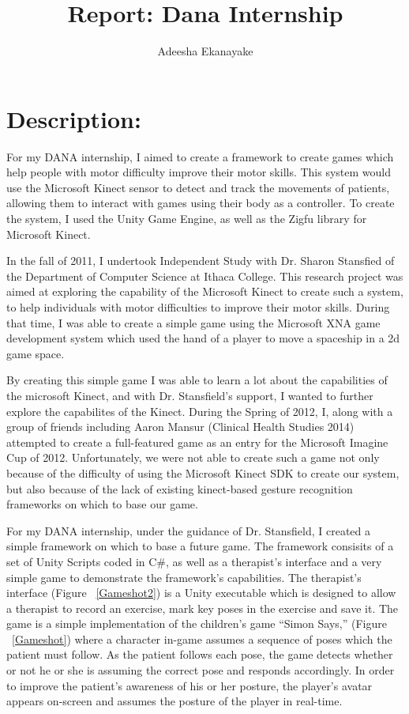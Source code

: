 \documentclass{article}
\author{Adeesha Ekanayake}
\title{Report: Dana Internship}
\begin{document}
\maketitle

\section{Description: }
For my DANA internship, I aimed to create a framework to create games which help people with motor difficulty improve their motor skills. This system would use the Microsoft Kinect sensor to detect and track the movements of patients, allowing them to interact with games using their body as a controller. To create the system, I used the Unity Game Engine, as well as the Zigfu library for Microsoft Kinect. 

In the fall of 2011, I undertook Independent Study with Dr. Sharon Stansfied of the Department of Computer Science at Ithaca College. This research project was aimed at exploring the capability of the Microsoft Kinect to create such a system, to help individuals with motor difficulties to improve their motor skills. During that time, I was able to create a simple game using the Microsoft XNA game development system which used the hand of a player to move a spaceship in a 2d game space. 

By creating this simple game I was able to learn a lot about the capabilities of the microsoft Kinect, and with Dr. Stansfield's support, I wanted to further explore the capabilites of the Kinect. During the Spring of 2012, I, along with a group of friends including Aaron Mansur (Clinical Health Studies 2014) attempted to create a full-featured game as an entry for the Microsoft Imagine Cup of 2012. Unfortunately, we were not able to create such a game not only because of the difficulty of using the Microsoft Kinect SDK to create our system, but also because of the lack of existing kinect-based gesture recognition frameworks on which to base our game. 

For my DANA internship, under the guidance of Dr. Stansfield, I created a simple framework on which to base a future game. The framework consisits of a set of Unity Scripts coded in C\#, as well as a therapist's interface and a very simple game to demonstrate the framework's capabilities. The therapist's interface (Figure ~\ref{Gameshot2}) is a Unity executable which is designed to allow a therapist to record an exercise, mark key poses in the exercise and save it. The game is a simple implementation of the children's game ``Simon Says,'' (Figure ~\ref{Gameshot}) where a character in-game assumes a sequence of poses which the patient must follow. As the patient follows each pose, the game detects whether or not he or she is assuming the correct pose and responds accordingly. In order to improve the patient's awareness of his or her posture, the player's avatar appears on-screen and assumes the posture of the player in real-time.
\end{document}
